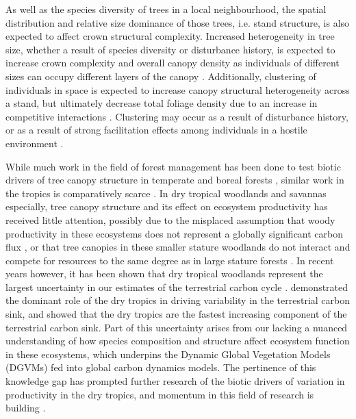 \documentclass[11pt,a4paper]{article}
\begin{document}
As well as the species diversity of trees in a local neighbourhood, the spatial distribution and relative size dominance of those trees, i.e. stand structure, is also expected to affect crown structural complexity. Increased heterogeneity in tree size, whether a result of species diversity or disturbance history, is expected to increase crown complexity and overall canopy density as individuals of different sizes can occupy different layers of the canopy \citep{}. Additionally, clustering of individuals in space is expected to increase canopy structural heterogeneity across a stand, but ultimately decrease total foliage density due to an increase in competitive interactions \citep{}. Clustering may occur as a result of disturbance history, or as a result of strong facilitation effects among individuals in a hostile environment \citep{Ratcliffe2017}.

While much work in the field of forest management has been done to test biotic drivers of tree canopy structure in temperate \citep{} and boreal forests \citep{}, similar work in the tropics is comparatively scarce \citep{}. In dry tropical woodlands and savannas especially, tree canopy structure and its effect on ecosystem productivity has received little attention, possibly due to the misplaced assumption that woody productivity in these ecosystems does not represent a globally significant carbon flux \citep{}, or that tree canopies in these smaller stature woodlands do not interact and compete for resources to the same degree as in large stature forests \citep{}. In recent years however, it has been shown that dry tropical woodlands represent the largest uncertainty in our estimates of the terrestrial carbon cycle \citep{Quere2018, Ahlstrom2015}. \citet{Sitch2015} demonstrated the dominant role of the dry tropics in driving variability in the terrestrial carbon sink, and showed that the dry tropics are the fastest increasing component of the terrestrial carbon sink. Part of this uncertainty arises from our lacking a nuanced understanding of how species composition and structure affect ecosystem function in these ecosystems, which underpins the Dynamic Global Vegetation Models (DGVMs) fed into global carbon dynamics models. The pertinence of this knowledge gap has prompted further research of the biotic drivers of variation in productivity in the dry tropics, and momentum in this field of research is building \citep{}. 
\end{document}
